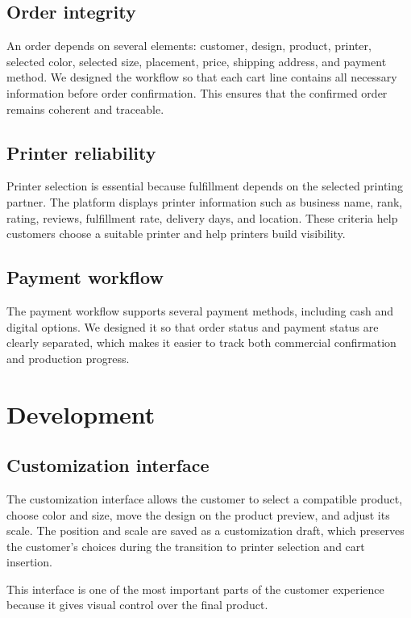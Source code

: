 \subsection{Order integrity}
An order depends on several elements: customer, design, product, printer, selected color, selected size, placement, price, shipping address, and payment method.
We designed the workflow so that each cart line contains all necessary information before order confirmation.
This ensures that the confirmed order remains coherent and traceable.

\subsection{Printer reliability}
Printer selection is essential because fulfillment depends on the selected printing partner.
The platform displays printer information such as business name, rank, rating, reviews, fulfillment rate, delivery days, and location.
These criteria help customers choose a suitable printer and help printers build visibility.

\subsection{Payment workflow}
The payment workflow supports several payment methods, including cash and digital options.
We designed it so that order status and payment status are clearly separated, which makes it easier to track both commercial confirmation and production progress.

\section{Development}
\subsection{Customization interface}
The customization interface allows the customer to select a compatible product, choose color and size, move the design on the product preview, and adjust its scale. The position and scale are saved as a customization draft, which preserves the customer's choices during the transition to printer selection and cart insertion.

This interface is one of the most important parts of the customer experience because it gives visual control over the final product.


